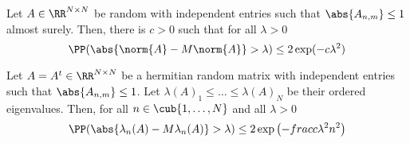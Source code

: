 \begin{corl}[]
  Let \(A \in \RR^{N \times N}\) be random with independent entries such that \( \abs{A_{n,m}} \leq 1\) almost surely. Then, there is $c>0$ such that for all \( \lambda>0\)
  \[\PP(\abs{ \norm{A}- M\norm{A} }> \lambda) \leq 2 \exp(-c \lambda^2)\]
\end{corl}


\begin{corl}
  Let \(A=A^t \in \RR^{N \times N}\) be a hermitian random matrix with independent entries such that  \(\abs{A_{n,m}}\leq 1\). Let \( \lambda(A)_1 \leq \dots \leq \lambda(A)_N \) be their ordered eigenvalues. Then, for all \(n\in \cub{ 1,\dots,N} \) and all \( \lambda>0\)
  \[\PP(\abs{\lambda_n(A)-M\lambda_n(A)}> \lambda ) \leq 2 \exp \left(- \\frac{c \lambda^2}{n^2}\right)\]
\end{corl}

  
